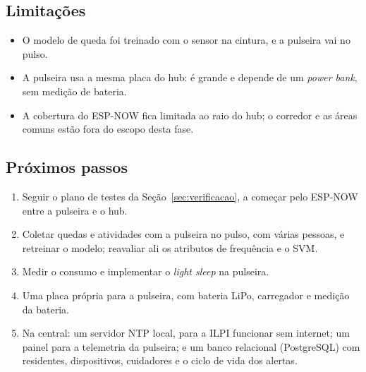 \subsection{Limitações}

\begin{itemize}
  \item O modelo de queda foi treinado com o sensor na cintura, e a pulseira vai no pulso.
  \item A pulseira usa a mesma placa do hub: é grande e depende de um \textit{power bank}, sem
        medição de bateria.
  \item A cobertura do ESP-NOW fica limitada ao raio do hub; o corredor e as áreas comuns
        estão fora do escopo desta fase.
\end{itemize}

\subsection{Próximos passos}

\begin{enumerate}
  \item Seguir o plano de testes da Seção~\ref{sec:verificacao}, a começar pelo ESP-NOW entre a
        pulseira e o hub.
  \item Coletar quedas e atividades com a pulseira no pulso, com várias pessoas, e retreinar
        o modelo; reavaliar ali os atributos de frequência e o SVM.
  \item Medir o consumo e implementar o \textit{light sleep} na pulseira.
  \item Uma placa própria para a pulseira, com bateria LiPo, carregador e medição da bateria.
  \item Na central: um servidor NTP local, para a ILPI funcionar sem internet; um painel para
        a telemetria da pulseira; e um banco relacional (PostgreSQL) com residentes,
        dispositivos, cuidadores e o ciclo de vida dos alertas.
\end{enumerate}
